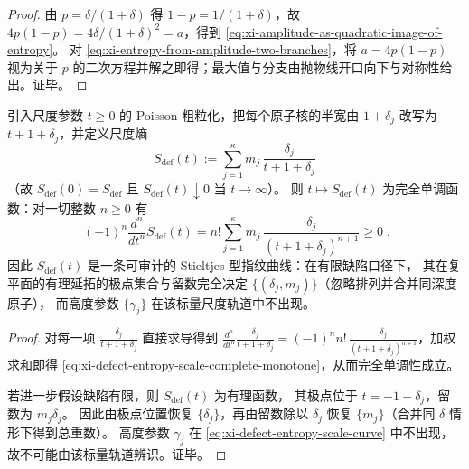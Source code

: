 \begin{proof}
由 \(p=\delta/(1+\delta)\) 得 \(1-p=1/(1+\delta)\)，故
\(
4p(1-p)=4\delta/(1+\delta)^2=a
\)，得到 \eqref{eq:xi-amplitude-as-quadratic-image-of-entropy}。
对 \eqref{eq:xi-entropy-from-amplitude-two-branches}，将 \(a=4p(1-p)\) 视为关于 \(p\) 的二次方程并解之即得；最大值与分支由抛物线开口向下与对称性给出。证毕。
\end{proof}

\begin{proposition}\label{prop:xi-defect-entropy-scale-fingerprint-stieltjes}
引入尺度参数 \(t\ge 0\) 的 Poisson 粗粒化，把每个原子核的半宽由 \(1+\delta_j\) 改写为 \(t+1+\delta_j\)，并定义尺度熵
\begin{equation}\label{eq:xi-defect-entropy-scale-curve}
\boxed{\;
S_{\mathrm{def}}(t):=\sum_{j=1}^{\kappa}m_j\,\frac{\delta_j}{t+1+\delta_j}\;}
\end{equation}
（故 \(S_{\mathrm{def}}(0)=S_{\mathrm{def}}\) 且 \(S_{\mathrm{def}}(t)\downarrow 0\) 当 \(t\to\infty\)）。
则 \(t\mapsto S_{\mathrm{def}}(t)\) 为完全单调函数：对一切整数 \(n\ge 0\) 有
\begin{equation}\label{eq:xi-defect-entropy-scale-complete-monotone}
\boxed{\;
(-1)^n\frac{d^n}{dt^n}S_{\mathrm{def}}(t)
=n!\sum_{j=1}^{\kappa}m_j\,\frac{\delta_j}{(t+1+\delta_j)^{n+1}}
\ge 0\; }.
\end{equation}
因此 \(S_{\mathrm{def}}(t)\) 是一条可审计的 Stieltjes 型指纹曲线：在有限缺陷口径下，
其在复平面的有理延拓的极点集合与留数完全决定 \(\{(\delta_j,m_j)\}\)（忽略排列并合并同深度原子），
而高度参数 \(\{\gamma_j\}\) 在该标量尺度轨道中不出现。
\end{proposition}

\begin{proof}
对每一项 \(\frac{\delta_j}{t+1+\delta_j}\) 直接求导得到
\(
\frac{d^n}{dt^n}\frac{\delta_j}{t+1+\delta_j}
=(-1)^n n!\,\frac{\delta_j}{(t+1+\delta_j)^{n+1}}
\)，加权求和即得 \eqref{eq:xi-defect-entropy-scale-complete-monotone}，从而完全单调性成立。
\par
若进一步假设缺陷有限，则 \(S_{\mathrm{def}}(t)\) 为有理函数，
其极点位于 \(t=-1-\delta_j\)，留数为 \(m_j\delta_j\)。
因此由极点位置恢复 \(\{\delta_j\}\)，再由留数除以 \(\delta_j\) 恢复 \(\{m_j\}\)（合并同 \(\delta\) 情形下得到总重数）。
高度参数 \(\gamma_j\) 在 \eqref{eq:xi-defect-entropy-scale-curve} 中不出现，故不可能由该标量轨道辨识。证毕。
\end{proof}

